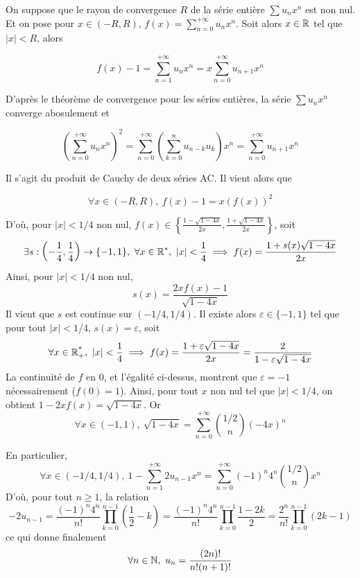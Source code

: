 \begin{solution}
On suppose que le rayon de convergence $R$ de la série entière $\sum u_nx^n$ est non nul.
Et on pose pour $x\in(-R,R)$, $f(x)=\sum_{n=0}^{+\infty}u_nx^n$. 
Soit alors $x\in\operatorname{\mathbb R}$ tel que $|x|<R$, alors 

\[f(x)-1=\sum_{n=1}^{+\infty}u_nx^n=x\sum_{n=0}^{+\infty}u_{n+1}x^n\]

D'après le théorème de convergence pour les séries entières, la série $\sum u_nx^n$ converge abosulement et 

\[\left(\sum_{n=0}^{+\infty}u_nx^n\right)^2=\sum_{n=0}^{+\infty}\left(\sum_{k=0}^nu_{n-k}u_k\right)x^n=\sum_{n=0}^{+\infty}u_{n+1}x^n\]

Il s'agit du produit de Cauchy de deux séries AC.
Il vient alors que

\[\forall x\in(-R,R),\ f(x)-1=x(f(x))^2\]

D'où, pour $|x|<1/4$ non nul, $f(x)\in\left\lbrace \frac{1-\sqrt{1-4x}}{2x},\frac{1+\sqrt{1-4x}}{2x}\right\rbrace$, soit 
\[\exists s:\left(-\frac14,\frac14\right)\to\lbrace-1,1\rbrace,\ \forall x\in\operatorname{\mathbb R}^*,\ |x|<\frac14\implies f(x)=\frac{1+s(x)\sqrt{1-4x}}{2x}\]
Ainsi, pour $|x|<1/4$ non nul, \[s(x)=\frac{2xf(x)-1}{\sqrt{1-4x}}\]
Il vient que $s$ est continue sur $\left(-1/4,1/4\right)$.
Il existe alors $\varepsilon\in\lbrace -1,1\rbrace$ tel que pour tout $|x|<1/4$, $s(x)=\varepsilon$, soit 
\[
    \forall x\in\Rpe,\ |x|<\frac14\implies f(x)=\frac{1+\varepsilon\sqrt{1-4x}}{2x}=\frac2{1-\varepsilon\sqrt{1-4x}}  
\]
La continuité de $f$ en $0$, et l'égalité ci-dessus, montrent que $\varepsilon=-1$ nécessairement ($f(0)=1$). 
Ainsi, pour tout $x$ non nul tel que $|x|<1/4$, on obtient $1-2xf(x)=\sqrt{1-4x}$. 
Or
\[
\forall x\in(-1,1),\ \sqrt{1-4x}=\sum_{n=0}^{+\infty}\binom{1/2}n(-4x)^n
\]

En particulier,
\[
    \forall x\in(-1/4,1/4),\ 1-\sum_{n=1}^{+\infty}2u_{n-1}x^n=\sum_{n=0}^{+\infty}(-1)^n4^n\binom{1/2}nx^n
\]
D'où, pour tout $n\geq 1$, la relation 
\[
    -2u_{n-1}=\frac{(-1)^n4^n}{n!}\prod_{k=0}^{n-1}\left(\frac12-k\right)=\frac{(-1)^n4^n}{n!}\prod_{k=0}^{n-1}\frac{1-2k}2=\frac{2^n}{n!}\prod_{k=0}^{n-1}(2k-1)    
\]
ce qui donne finalement 
\[
    \forall n\in\N,\ u_n=\frac{(2n)!}{n!(n+1)!}
\]
\end{solution}

